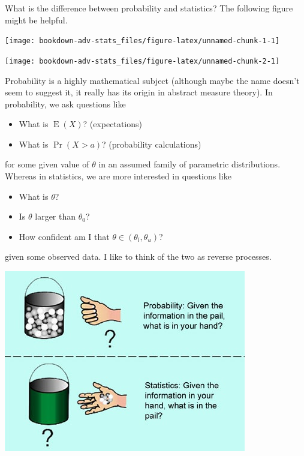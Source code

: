 \documentclass[
]{book}
\providecommand{\tightlist}{%
  \setlength{\itemsep}{0pt}\setlength{\parskip}{0pt}}
\DeclareMathOperator{\E}{E}
\theoremstyle{definition}
\theoremstyle{definition}
\theoremstyle{definition}
\theoremstyle{definition}
\theoremstyle{remark}
\begin{document}
What is the difference between probability and statistics? The following figure might be helpful.

\begin{center}\texttt{[image: bookdown-adv-stats\_files/figure-latex/unnamed-chunk-1-1]} \end{center}

\begin{center}\texttt{[image: bookdown-adv-stats\_files/figure-latex/unnamed-chunk-2-1]} \end{center}

Probability is a highly mathematical subject (although maybe the name doesn't seem to suggest it, it really has its origin in abstract measure theory). In probability, we ask questions like

\begin{itemize}
\tightlist
\item
  What is \(\E(X)\)? (expectations)
\item
  What is \(\Pr(X > a)\)? (probability calculations)
\end{itemize}

for some given value of \(\theta\) in an assumed family of parametric distributions.
Whereas in statistics, we are more interested in questions like

\begin{itemize}
\tightlist
\item
  What is \(\theta\)?
\item
  Is \(\theta\) larger than \(\theta_0\)?
\item
  How confident am I that \(\theta \in (\theta_l,\theta_u)\)?
\end{itemize}

given some observed data. I like to think of the two as reverse processes.

\begin{center}\includegraphics[width=0.8\linewidth]{figure/00-probstats} \end{center}
\end{document}
